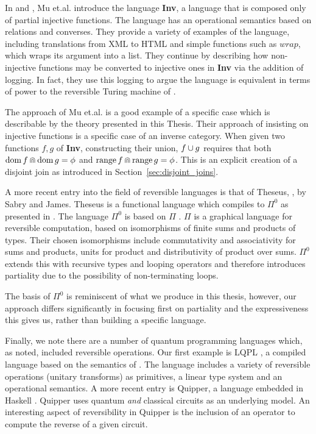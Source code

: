 In \cite{mu06bidirectional} and \cite{muetal04:injreversible}, Mu et.al. introduce the language
\textbf{Inv}, a language that is composed only of partial injective functions. The language has an
operational semantics based on relations and converses. They provide a variety of examples of the
language, including translations from XML to HTML and simple functions such as $wrap$, which wraps
its argument into a list. They continue by describing how non-injective functions may be converted to
injective ones in \textbf{Inv} via the addition of logging. In fact, they use this logging to argue
the language is equivalent in terms of power to the reversible Turing machine of
\cite{bennett:1973reverse}.

The approach of Mu et.al. is a good example of a specific case which is describable by the theory
presented in this Thesis. Their approach of insisting on injective functions is a specific case of
an inverse category. When given two functions $f,g$ of \textbf{Inv}, constructing their union,
$f\cup g$ requires that both $\operatorname*{dom} f \Cap \operatorname*{dom} g = \phi$ and $\operatorname*{range} f \Cap \operatorname*{range} g =
\phi$. This is an explicit creation of a disjoint join as introduced in
Section~\ref{sec:disjoint_joins}.

A more recent entry into the field of reversible languages is that of Theseus,
\cite{james2014theseus}, by Sabry and James. Theseus is a functional language which compiles to
$\Pi^0$ as presented in \cite{james2013isomorphic}. The language $\Pi^0$ is based on $\Pi$
\cite{james2012information}.  $\Pi$ is a graphical language for reversible computation, based on
isomorphisms of finite sums and products of types. Their chosen isomorphisms include commutativity
and associativity for sums and products, units for product and distributivity of product over
sums. $\Pi^0$ extends this with recursive types and looping operators and therefore introduces partiality
due to the possibility of non-terminating loops.

The basis of $\Pi^0$ is reminiscent of what we produce in this thesis, however, our approach differs
significantly in focusing first on partiality and the expressiveness this gives us, rather than
building a specific language.


Finally, we note there are a number of quantum programming languages which, as noted, included
reversible operations. Our first example is LQPL \cite{giles2007}, a compiled language based on the
semantics of \cite{selinger04:qpl}. The language includes a variety of reversible operations
(unitary transforms) as primitives, a linear type system and an operational semantics. A more recent
entry is Quipper, \cite{green2013introduction,green2013quipper} a language embedded in Haskell
\cite{peyton2003:haskell98}. Quipper uses quantum \emph{and} classical circuits as an underlying
model. An interesting aspect of reversibility in Quipper is the inclusion of an operator to compute
the reverse of a given circuit.

